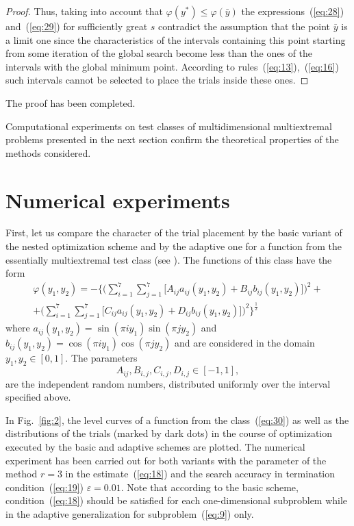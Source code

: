 \documentclass[smallextended]{svjour3}
\let\origref\ref
\renewcommand{\ref}[1]{(\origref{#1})}
\begin{document}
\begin{proof}
Thus, taking into account that $\varphi(y^*) \leq \varphi(\bar{y})$ the expressions~\ref{eq:28} and~\ref{eq:29} for sufficiently great $s$ contradict the assumption that the point $\bar{y}$ is a limit one since the characteristics of the intervals containing this point starting from some iteration of the global search become less than the ones of the intervals with the global minimum point. According to rules~\ref{eq:13},~\ref{eq:16} such intervals cannot be selected to place the trials inside these ones.
\end{proof}

The proof has been completed.

Computational experiments on test classes of multidimensional multiextremal problems presented in the next section confirm the theoretical properties of the methods considered.

\section{Numerical experiments}
\label{sec:4}
First, let us compare the character of the trial placement by the basic variant of the nested optimization scheme and by the adaptive one for a function from the essentially multiextremal test class (see \cite{Ref10, Ref11}). The functions of this class have the form
\begin{multline}
\label{eq:30}
\varphi(y_1, y_2) = -\Bigg\{ \bigg( \sum_{i = 1}^{7}\sum_{j = 1}^{7} \Big[ A_{i j}a_{i j}(y_1, y_2) + B_{i j}b_{i j}(y_1, y_2) \Big] \bigg)^2 + \\
+ \bigg( \sum_{i = 1}^{7}\sum_{j = 1}^{7} \Big[ C_{i j}a_{i j}(y_1, y_2) + D_{i j}b_{i j}(y_1, y_2) \Big] \bigg)^2 \Bigg\}^\frac{1}{2}
\end{multline}
%
where $a_{i j}(y_1, y_2) = \sin(\pi i y_1)\sin(\pi j y_2)$ and $b_{i j}(y_1, y_2) = \cos(\pi i y_1)\cos(\pi j y_2)$ and are considered in the domain $y_1, y_2 \in [0, 1]$. The parameters
\begin{equation*}
A_{i j}, B_{i, j}, C_{i, j}, D_{i, j} \in [-1, 1],
\end{equation*}
are the independent random numbers, distributed uniformly over the interval specified above.

In Fig.~\origref{fig:2}, the level curves of a function from the class~\ref{eq:30} as well as the distributions of the trials (marked by dark dots) in the course of optimization executed by the basic and adaptive schemes are plotted. The numerical experiment has been carried out for both variants with the parameter of the method $r = 3$ in the estimate~\ref{eq:18} and the search accuracy in termination condition~\ref{eq:19} $\varepsilon = 0.01$. Note that according to the basic scheme, condition~\ref{eq:18} should be satisfied for each one-dimensional subproblem while in the adaptive generalization for subproblem~\ref{eq:9} only.
\end{document}
